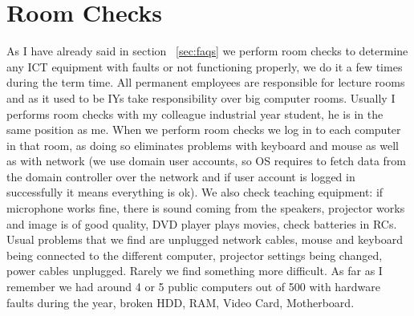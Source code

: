\documentclass[10pt,a4paper,headinclude=true]{report}
\begin{document}
\section{Room Checks}
As I have already said in section ~\ref{sec:faqs} we perform room checks to determine any ICT equipment with faults or not functioning properly, we do it a few times during the term time. All permanent employees are responsible for lecture rooms and as it used to be IYs take responsibility over big computer rooms. Usually I performs room checks with my colleague industrial year student, he is in the same position as me. When we perform room checks we log in to each computer in that room, as doing so eliminates problems with keyboard and mouse as well as with network (we use domain user accounts, so OS requires to fetch data from the domain controller over the network and if user account is logged in successfully it means everything is ok). We also check teaching equipment: if microphone works fine, there is sound coming from the speakers, projector works and image is of good quality, DVD player plays movies, check batteries in RCs. Usual problems that we find are unplugged network cables, mouse and keyboard being connected to the different computer, projector settings being changed, power cables unplugged. Rarely we find something more difficult. As far as I remember we had around 4 or 5 public computers out of 500 with hardware faults during the year, broken HDD, RAM, Video Card, Motherboard. 
\end{document}
